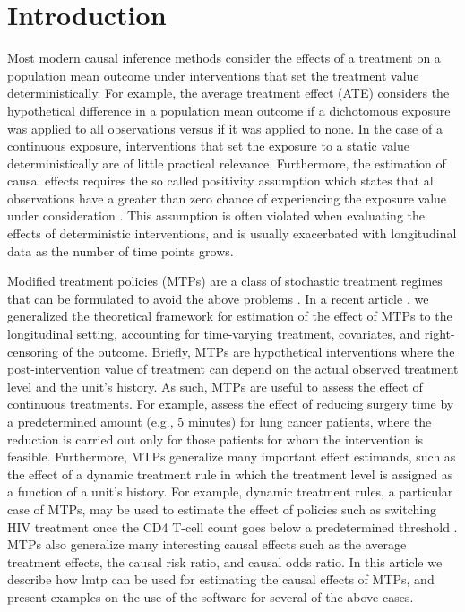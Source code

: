 \documentclass[twoside,11pt]{article}
\begin{document}
\section{Introduction}

Most modern causal inference methods consider the effects of a treatment on a population mean outcome under interventions that set the treatment value deterministically. For example, the average treatment effect (ATE) considers the hypothetical difference in a population mean outcome if a dichotomous exposure was applied to all observations versus if it was applied to none. In the case of a continuous exposure, interventions that set the exposure to a static value deterministically are of little practical relevance. Furthermore, the estimation of causal effects requires the so called positivity assumption which states that all observations have a greater than zero chance of experiencing the exposure value under consideration \citep{rosenbaumCentralRolePropensity1983}. This assumption is often violated when evaluating the effects of deterministic interventions, and is usually exacerbated with longitudinal data as the number of time points grows.

Modified treatment policies (MTPs) are a class of stochastic treatment regimes that can be formulated to avoid the above problems \citep{munozPopulationInterventionCausal2012, haneuseEstimationEffectInterventions2013}. In a recent article
\citep{jasaLMTP}, we generalized the theoretical framework for estimation of the effect of MTPs to the longitudinal setting, accounting for time-varying treatment, covariates, and right-censoring of the outcome. Briefly, MTPs are hypothetical interventions where the post-intervention value of treatment can depend on the actual observed treatment level and the
unit's history. As such, MTPs are useful to assess the effect of continuous treatments. For example, \citet{haneuseEstimationEffectInterventions2013} assess the effect of reducing surgery time by a predetermined amount (e.g., 5 minutes) for lung cancer patients, where the reduction is carried out only for those patients for whom the intervention is feasible. Furthermore, MTPs generalize many important effect estimands, such as the effect of a dynamic treatment rule in which the treatment level is assigned as a function of a unit's history. For example, dynamic treatment rules, a particular case of MTPs, may be used to estimate the effect of policies such as switching HIV treatment once the CD4 T-cell count goes below a predetermined threshold \citep{petersen2014delayed}. MTPs also generalize many interesting causal effects such as the average treatment effects, the causal risk ratio, and causal odds ratio. In this article we describe how lmtp can be used for estimating the causal effects of MTPs, and present examples on the use of the software for several of the above cases.
\end{document}
